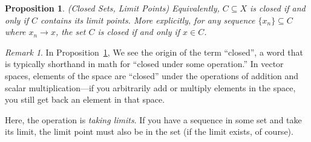 \documentclass[12pt]{article}
\theoremstyle{plain}
\newtheorem{prop}[thm]{Proposition}
\theoremstyle{definition}
\theoremstyle{remark}
\newtheorem*{rmk}{Remark}
\begin{document}
\begin{prop}{\emph{(Closed Sets, Limit Points)}}
\label{prop:closed}
Equivalently, $C\subseteq X$ is \emph{closed} if and only if $C$
contains its limit points. More explicitly, for any sequence
$\{x_n\}\subseteq C$ where $x_n\rightarrow x$, the set $C$ is closed if
and only if $x\in C$.
\end{prop}
\begin{rmk}
In Proposition~\ref{prop:closed}, We see the origin of the term
``closed'', a word that is typically shorthand in math for ``closed
under some operation.'' In vector spaces, elements of the space are
``closed'' under the operations of addition and scalar
multiplication---if you arbitrarily add or multiply elements in the
space, you still get back an element in that space.

Here, the operation is \emph{taking limits}. If you have a sequence in
some set and take its limit, the limit point must also be in the set (if
the limit exists, of course).
\end{rmk}
\end{document}
